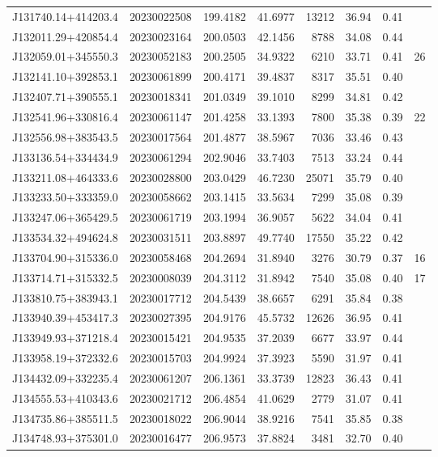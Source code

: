 \documentclass{article}
\begin{document}
\begin {longtable}{|l|l|r|r|r|r|r|l|}
 J131740.14+414203.4&  20230022508&  199.4182&   41.6977& 13212& 36.94& 0.41&\\
 J132011.29+420854.4&  20230023164&  200.0503&   42.1456&  8788& 34.08& 0.44&\\
 J132059.01+345550.3&  20230052183&  200.2505&   34.9322&  6210& 33.71& 0.41&26\\
 J132141.10+392853.1&  20230061899&  200.4171&   39.4837&  8317& 35.51& 0.40&\\
 J132407.71+390555.1&  20230018341&  201.0349&   39.1010&  8299& 34.81& 0.42&\\
 J132541.96+330816.4&  20230061147&  201.4258&   33.1393&  7800& 35.38& 0.39&22\\
 J132556.98+383543.5&  20230017564&  201.4877&   38.5967&  7036& 33.46& 0.43&\\
 J133136.54+334434.9&  20230061294&  202.9046&   33.7403&  7513& 33.24& 0.44&\\
 J133211.08+464333.6&  20230028800&  203.0429&   46.7230& 25071& 35.79& 0.40&\\
 J133233.50+333359.0&  20230058662&  203.1415&   33.5634&  7299& 35.08& 0.39&\\
 J133247.06+365429.5&  20230061719&  203.1994&   36.9057&  5622& 34.04& 0.41&\\
 J133534.32+494624.8&  20230031511&  203.8897&   49.7740& 17550& 35.22& 0.42&\\
 J133704.90+315336.0&  20230058468&  204.2694&   31.8940&  3276& 30.79& 0.37&16\\
 J133714.71+315332.5&  20230008039&  204.3112&   31.8942&  7540& 35.08& 0.40&17\\
 J133810.75+383943.1&  20230017712&  204.5439&   38.6657&  6291& 35.84& 0.38&\\
 J133940.39+453417.3&  20230027395&  204.9176&   45.5732& 12626& 36.95& 0.41&\\
 J133949.93+371218.4&  20230015421&  204.9535&   37.2039&  6677& 33.97& 0.44&\\
 J133958.19+372332.6&  20230015703&  204.9924&   37.3923&  5590& 31.97& 0.41&\\
 J134432.09+332235.4&  20230061207&  206.1361&   33.3739& 12823& 36.43& 0.41&\\
 J134555.53+410343.6&  20230021712&  206.4854&   41.0629&  2779& 31.07& 0.41&\\
 J134735.86+385511.5&  20230018022&  206.9044&   38.9216&  7541& 35.85& 0.38&\\
 J134748.93+375301.0&  20230016477&  206.9573&   37.8824&  3481& 32.70& 0.40&\\

\end{longtable}
\end{document}
